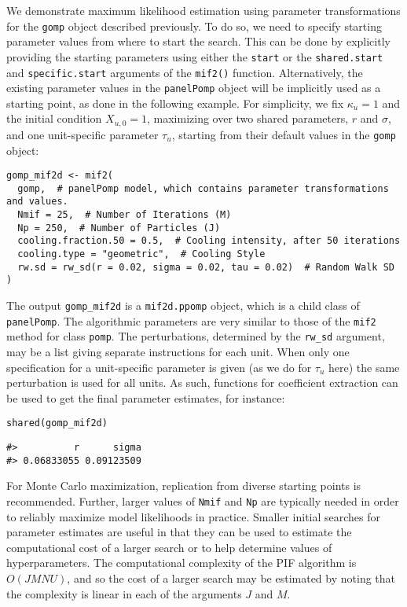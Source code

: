 We demonstrate maximum likelihood estimation using parameter transformations for the \texttt{gomp} object described previously.
To do so, we need to specify starting parameter values from where to start the search.
This can be done by explicitly providing the starting parameters using either the \texttt{start} or the \texttt{shared.start} and \texttt{specific.start} arguments of the \texttt{mif2()} function.
Alternatively, the existing parameter values in the \texttt{panelPomp} object will be implicitly used as a starting point, as done in the following example.
For simplicity, we fix \(\kappa_{u}=1\) and the initial condition \(X_{u,0}=1\), maximizing over two shared parameters, \(r\) and \(\sigma\), and one unit-specific parameter \(\tau_u\), starting from their default values in the \texttt{gomp} object:

\begin{verbatim}
gomp_mif2d <- mif2(
  gomp,  # panelPomp model, which contains parameter transformations and values.
  Nmif = 25,  # Number of Iterations (M)
  Np = 250,  # Number of Particles (J)
  cooling.fraction.50 = 0.5,  # Cooling intensity, after 50 iterations
  cooling.type = "geometric",  # Cooling Style
  rw.sd = rw_sd(r = 0.02, sigma = 0.02, tau = 0.02)  # Random Walk SD
)
\end{verbatim}

\noindent The output \texttt{gomp\_mif2d} is a \texttt{mif2d.ppomp} object, which is a child class of \texttt{panelPomp}.
The algorithmic parameters are very similar to those of the \texttt{mif2} method for class \texttt{pomp}.
The perturbations, determined by the \texttt{rw\_sd} argument, may be a list giving separate instructions for each unit.
When only one specification for a unit-specific parameter is given (as we do for \(\tau_u\) here) the same perturbation is used for all units.
As such, functions for coefficient extraction can be used to get the final parameter estimates, for instance:

\begin{verbatim}
shared(gomp_mif2d)
\end{verbatim}

\begin{verbatim}
#>          r      sigma 
#> 0.06833055 0.09123509
\end{verbatim}

For Monte Carlo maximization, replication from diverse starting points is recommended.
Further, larger values of \texttt{Nmif} and \texttt{Np} are typically needed in order to reliably maximize model likelihoods in practice.
Smaller initial searches for parameter estimates are useful in that they can be used to estimate the computational cost of a larger search or to help determine values of hyperparameters.
The computational complexity of the PIF algorithm is \(O(JMNU)\), and so the cost of a larger search may be estimated by noting that the complexity is linear in each of the arguments \(J\) and \(M\).

